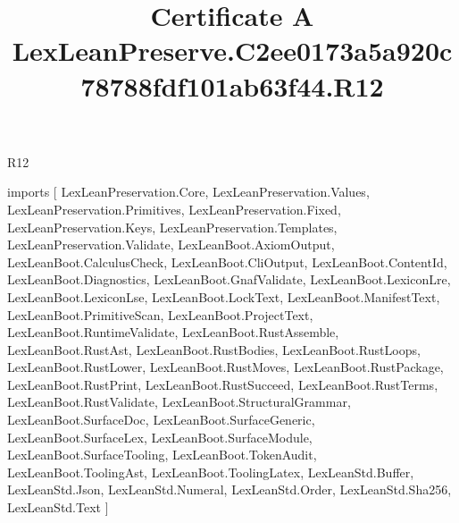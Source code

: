 \begin{lexlean}{R12}
\title{Certificate A LexLeanPreserve.C2ee0173a5a920c78788fdf101ab63f44.R12}
\begin{coremodule}
imports [
  LexLeanPreservation.Core,
  LexLeanPreservation.Values,
  LexLeanPreservation.Primitives,
  LexLeanPreservation.Fixed,
  LexLeanPreservation.Keys,
  LexLeanPreservation.Templates,
  LexLeanPreservation.Validate,
  LexLeanBoot.AxiomOutput,
  LexLeanBoot.CalculusCheck,
  LexLeanBoot.CliOutput,
  LexLeanBoot.ContentId,
  LexLeanBoot.Diagnostics,
  LexLeanBoot.GnafValidate,
  LexLeanBoot.LexiconLre,
  LexLeanBoot.LexiconLse,
  LexLeanBoot.LockText,
  LexLeanBoot.ManifestText,
  LexLeanBoot.PrimitiveScan,
  LexLeanBoot.ProjectText,
  LexLeanBoot.RuntimeValidate,
  LexLeanBoot.RustAssemble,
  LexLeanBoot.RustAst,
  LexLeanBoot.RustBodies,
  LexLeanBoot.RustLoops,
  LexLeanBoot.RustLower,
  LexLeanBoot.RustMoves,
  LexLeanBoot.RustPackage,
  LexLeanBoot.RustPrint,
  LexLeanBoot.RustSucceed,
  LexLeanBoot.RustTerms,
  LexLeanBoot.RustValidate,
  LexLeanBoot.StructuralGrammar,
  LexLeanBoot.SurfaceDoc,
  LexLeanBoot.SurfaceGeneric,
  LexLeanBoot.SurfaceLex,
  LexLeanBoot.SurfaceModule,
  LexLeanBoot.SurfaceTooling,
  LexLeanBoot.TokenAudit,
  LexLeanBoot.ToolingAst,
  LexLeanBoot.ToolingLatex,
  LexLeanStd.Buffer,
  LexLeanStd.Json,
  LexLeanStd.Numeral,
  LexLeanStd.Order,
  LexLeanStd.Sha256,
  LexLeanStd.Text
]


\end{coremodule}
\end{lexlean}
